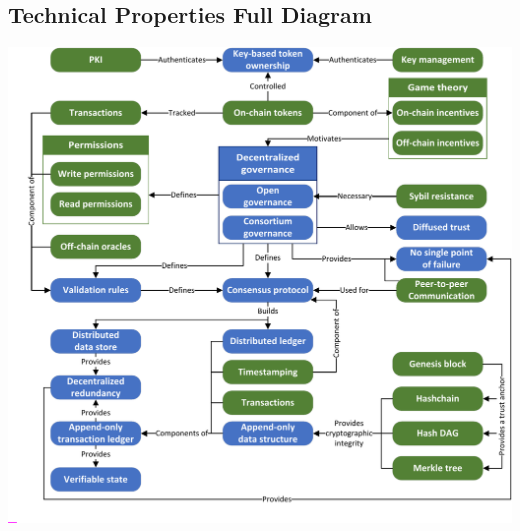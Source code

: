 \subsection{Technical Properties Full Diagram}

\begin{center}
	\includegraphics[page=1,width=\columnwidth]{figures/grounded-theory-main}
	\label{fig:technical-properties-full}
\end{center}

%	
